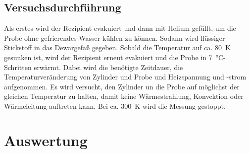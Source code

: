 \subsection{Versuchsdurchführung}
Als erstes wird der Rezipient evakuiert und dann mit Helium gefüllt, um die Probe
ohne gefrierendes Wasser kühlen zu können. Sodann wird flüssiger Stickstoff in das
Dewargefäß gegeben. Sobald die Temperatur auf ca. \SI{80}{\kelvin} gesunken ist,
wird der Rezipient erneut evakuiert und die Probe in \SI{7}{\celsius}-
Schritten erwärmt. Dabei wird die benötigte Zeitdauer, die Temperaturveränderung
von Zylinder und Probe und Heizspannung und -strom aufgenommen. Es wird versucht,
den Zylinder un die Probe auf möglichst der gleichen Temperatur zu halten, damit
keine Wärmestrahlung, Konvektion oder Wärmeleitung auftreten kann. Bei ca. \SI{300}{\kelvin}
wird die Messung gestoppt.
\section{Auswertung}
